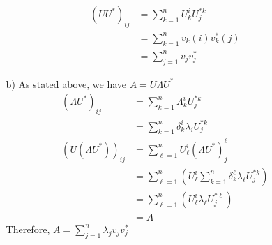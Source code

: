 \documentclass{article}
\begin{document}
\begin{itemize}
\begin{itemize}
        \begin{align*}
            (UU^*)_{ij}&=\sum_{k=1}^{n}U^{i}_{k}U^{*k}_j\\
            &=\sum_{k=1}^{n}v_k(i)v^*_k(j)\\
            &=\sum_{j=1}^{n}v_jv_j^*
        \end{align*}
        \item [b)] As stated above, we have \(A=U\Lambda U^*\)
        \begin{align*}
            (\Lambda U^*)_{ij}&=\sum_{k=1}^{n}\Lambda^i_k U^{*k}_j\\
            &=\sum_{k=1}^{n}\delta^i_k\lambda_iU^{*k}_j\\
            \left(U(\Lambda U^*)\right)_{ij}&=\sum_{\ell=1}^{n} U^i_\ell(\Lambda U^*)^\ell_j\\
            &=\sum_{\ell=1}^{n}\left(U^i_\ell\sum_{k=1}^{n}\delta^\ell_k\lambda_\ell U^{*k}_j\right)\\
            &=\sum_{\ell=1}^{n}\left(U^i_\ell\lambda_\ell U^{*\ell}_j\right)\\
            &=A
        \end{align*}
        Therefore,  \(A=\sum_{j=1}^{n}\lambda_jv_jv_j^*\)
    \end{itemize}
\end{itemize}
\end{document}
